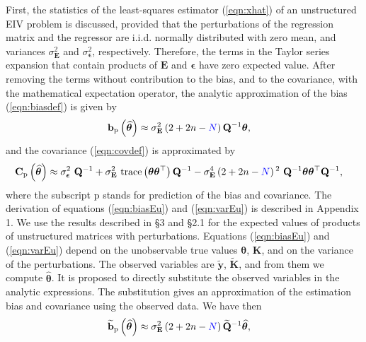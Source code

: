 First, the statistics of the least-squares estimator (\ref{eqn:xhat}) of an unstructured EIV problem is discussed, 
provided that the perturbations of the regression matrix and the regressor are i.i.d. normally distributed with zero mean, and variances $\sigma_{\mathbf{E}}^2$ and $\sigma_{\bm{\epsilon}}^2$, respectively.
Therefore, the terms in the Taylor series expansion that contain products of $\mathbf{E}$ and $\bm{\epsilon}$ have zero expected value.
After removing the terms without contribution to the bias, and to the covariance, with the mathematical expectation operator,
the analytic approximation of the bias (\ref{eqn:biasdef}) is given by 
\begin{equation} \begin{aligned} \mathbf{b}_{\mathrm{p}} \left( \widehat{\bm{\theta}} \right) & \approx \sigma_{\mathbf{E}}^2 \left( 2 + 2n - \color{blue}N\color{black} \right) \mathbf{Q}^{-1} \bm{\theta} , \end{aligned} \label{eqn:biasEu} \end{equation}
and the covariance (\ref{eqn:covdef}) is approximated by 
\begin{equation} \begin{aligned} \mathbf{C}_{\mathrm{p}} \left( \widehat{\bm{\theta}} \right) & \approx \sigma_{\bm{\epsilon}}^2 \ \mathbf{Q}^{-1} + \sigma_{\mathbf{E}}^2 \ \mathrm{trace} \left( \bm{\theta} \bm{\theta}^\top \right) \mathbf{Q}^{-1} - \sigma_{\mathbf{E}}^4 \left( 2 + 2n - \color{blue}N\color{black} \right)^2 \ \mathbf{Q}^{-1} \bm{\theta} \bm{\theta}^\top \mathbf{Q}^{-1} , \end{aligned} \label{eqn:varEu} \end{equation}
where the subscript $\mathrm{p}$ stands for prediction of the bias and covariance.
The derivation of equations (\ref{eqn:biasEu}) and (\ref{eqn:varEu}) is described in Appendix 1.
We use the results described in \citet{Vaccaro94} \S 3 and \citet{Stewart90SPT} \S 2.1 for the expected values of products of unstructured matrices with perturbations.
Equations (\ref{eqn:biasEu}) and (\ref{eqn:varEu}) depend on the unobservable true values $\bm{\theta}$, $\mathbf{K}$, and on the variance of the perturbations.
The observed variables are $\widetilde{\mathbf{y}}$, $\widetilde{\mathbf{K}}$, and from them we compute $\widehat{\bm{\theta}}$.
It is proposed to directly substitute the observed variables in the analytic expressions.
The substitution gives an approximation of the estimation bias and covariance using the observed data.
We have then
\begin{equation} \begin{aligned} \widetilde{\mathbf{b}}_{\mathrm{p}} \left( \widehat{\bm{\theta}} \right) & \approx \sigma_{\mathbf{E}}^2 \left( 2 + 2n - \color{blue}N\color{black} \right) \widetilde{\mathbf{Q}}^{-1} \widehat{\bm{\theta}} , \end{aligned} \label{eqn:biasEuST} \end{equation}
